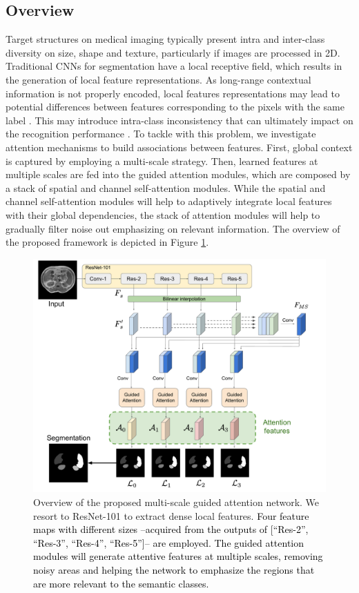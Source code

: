 \documentclass[journal]{IEEEtran}
\begin{document}
\subsection{Overview}

Target structures on medical imaging typically present intra and inter-class diversity on size, shape and texture, particularly if images are processed in 2D. Traditional CNNs for segmentation have a local receptive field, which results in the generation of local feature representations. As long-range contextual information is not properly encoded, local features representations may lead to potential differences between features corresponding to the pixels with the same label \cite{fu2018dual}. This may introduce intra-class inconsistency that can ultimately impact on the recognition performance \cite{peng2017large}. To tackle with this problem, we investigate attention mechanisms to build associations between features. First, global context is captured by employing a multi-scale strategy. Then, learned features at multiple scales are fed into the guided attention modules, which are composed by a stack of spatial and channel self-attention modules. While the spatial and channel self-attention modules will help to adaptively integrate local features with their global dependencies, the stack of attention modules will help to gradually filter noise out emphasizing on relevant information. The overview of the proposed framework is depicted in Figure \ref{fig:overview}.





 



\begin{figure}
    \centering
    \includegraphics[width=.45\textwidth]{Overview.pdf}
    \caption{Overview of the proposed multi-scale guided attention network. We resort to ResNet-101 to extract dense local features. \textcolor{black}{ Four feature maps with different sizes --acquired from the outputs of [“Res-2”, “Res-3”, “Res-4”, “Res-5”]-- are employed. The guided attention modules will generate attentive features at multiple scales, removing noisy areas and helping the network to emphasize the regions that are more relevant to the semantic classes. }}
    \label{fig:overview}
\end{figure}
\end{document}
